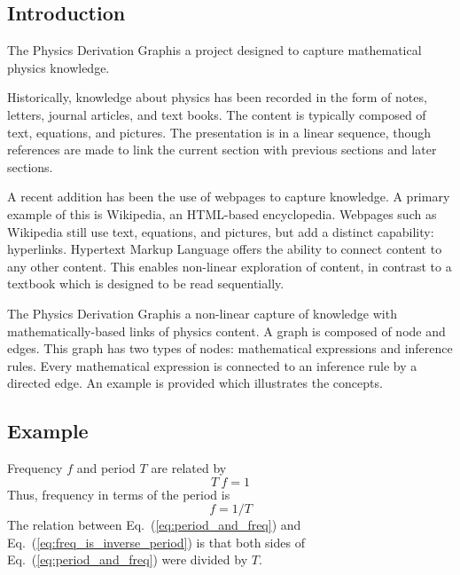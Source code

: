 \documentclass{article}
\newcommand{\eqn}[1]{Eq.\ (\ref{#1})}
\newcommand{\pdg}{Physics Derivation Graph}
\begin{document}
\begin{multicols}{2}




\section{Introduction\label{sec:intro}}

The \pdg is a project designed to capture mathematical physics knowledge. 

Historically, knowledge about physics has been recorded in the form of notes, letters, journal articles, and text books. The content is typically composed of text, equations, and pictures. The presentation is in a linear sequence, though references are made to link the current section with previous sections and later sections. 

A recent addition has been the use of webpages to capture knowledge. A primary example of this is Wikipedia, an HTML-based encyclopedia. Webpages such as Wikipedia still use text, equations, and pictures, but add a distinct capability: hyperlinks. Hypertext Markup Language offers the ability to connect content to any other content. This enables non-linear exploration of content, in contrast to a textbook which is designed to be read sequentially. 

The \pdg is a non-linear capture of knowledge with mathematically-based links of physics content. A graph is composed of node and edges. This graph has two types of nodes: mathematical expressions and inference rules. Every mathematical expression is connected to an inference rule by a directed edge. An example is provided which illustrates the concepts.

\subsection{Example\label{sec:example}}

Frequency $f$ and period $T$ are related by
\begin{equation}
T\ f = 1
\label{eq:period_and_freq}
\end{equation}
Thus, frequency in terms of the period is
\begin{equation}
f = 1/T
\label{eq:freq_is_inverse_period}
\end{equation}
The relation between \eqn{eq:period_and_freq} and \eqn{eq:freq_is_inverse_period} is that both sides of \eqn{eq:period_and_freq} were divided by $T$. 


\end{multicols}
\end{document}
